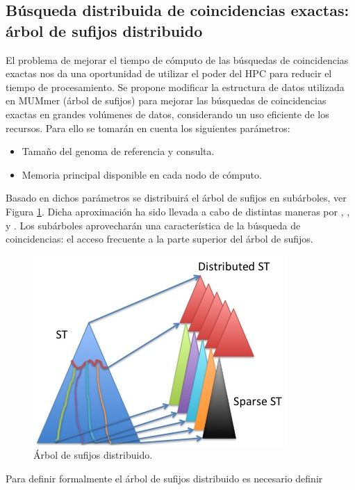 \documentclass[11pt,a4paper,english]{article}
\begin{document}
\subsection{Búsqueda distribuida de coincidencias exactas: árbol de sufijos distribuido}
El problema de mejorar el tiempo de cómputo de las búsquedas de coincidencias 
exactas nos da una oportunidad de utilizar el poder del HPC para reducir el
tiempo de procesamiento. Se propone modificar la estructura de datos utilizada en 
MUMmer (árbol de sufijos) para mejorar las búsquedas de coincidencias exactas en 
grandes volúmenes de datos, considerando un uso eficiente de los recursos. Para 
ello se tomarán en cuenta los siguientes parámetros: 
\begin{itemize}
\item Tamaño del genoma de referencia y consulta.
\item Memoria principal disponible en cada nodo de cómputo.
\end{itemize}
Basado en dichos parámetros se distribuirá el árbol de sufijos en subárboles, 
ver Figura \ref{fig:estructura}. Dicha aproximación ha sido llevada a cabo de distintas maneras por \cite{Mansour2012}, 
\cite{Japp2004}, \cite{Ghoting2010} y \cite{Sadakane}.
 Los subárboles aprovecharán una característica
de la búsqueda de coincidencias: el acceso frecuente a la parte superior del 
árbol de sufijos.\\ 
\begin{figure}[h]
\begin{center}
\includegraphics[scale=0.8]{distributed.png}
\caption{Árbol de sufijos distribuido.}
\label{fig:estructura}
\end{center}
\end{figure}
Para definir formalmente el árbol de sufijos distribuido es necesario definir 
\end{document}
